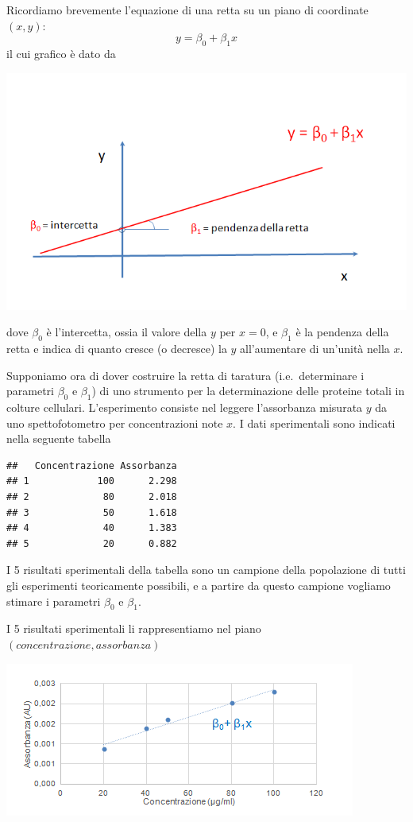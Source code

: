 \documentclass[
  11pt,
]{book}
\begin{document}
Ricordiamo brevemente l'equazione di una retta su un piano di coordinate \((x,y)\):
\[
y=\beta_0+\beta_1x
\]
il cui grafico è dato da

\begin{center}\includegraphics[width=0.5\linewidth]{Immagini/Regressione/01_graf_retta} \end{center}

dove \(\beta_0\) è l'intercetta, ossia il valore della \(y\) per \(x=0\), e \(\beta_1\) è la pendenza della retta e indica di quanto cresce (o decresce) la \(y\) all'aumentare di un'unità nella \(x\).

Supponiamo ora di dover costruire la retta di taratura (i.e.~determinare i parametri \(\beta_0\) e \(\beta_1\)) di uno strumento per la determinazione delle proteine totali in colture cellulari. L'esperimento consiste nel leggere l'assorbanza misurata \(y\) da uno spettofotometro per concentrazioni note \(x\). I dati sperimentali sono indicati nella seguente tabella

\begin{verbatim}
##   Concentrazione Assorbanza
## 1            100      2.298
## 2             80      2.018
## 3             50      1.618
## 4             40      1.383
## 5             20      0.882
\end{verbatim}

I 5 risultati sperimentali della tabella sono un campione della popolazione di tutti gli esperimenti teoricamente possibili, e a partire da questo campione vogliamo stimare i parametri \(\beta_0\) e \(\beta_1\).

I 5 risultati sperimentali li rappresentiamo nel piano \((concentrazione,assorbanza)\)

\begin{center}\includegraphics[width=0.5\linewidth]{Immagini/Regressione/02_graf_dati} \end{center}
\end{document}

